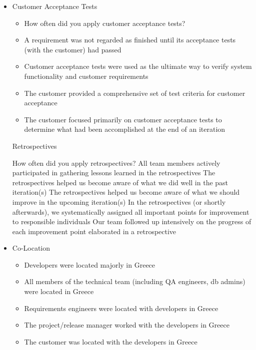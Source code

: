 \begin{appendices}
\begin{itemize}
\begin{itemize}
		\end{itemize}
	\item Customer Acceptance Tests
		\begin{itemize}
			\item How often did you apply customer acceptance tests?
			\item A requirement was not regarded as finished until its acceptance tests (with the customer) had passed
			\item Customer acceptance tests were used as the ultimate way to verify system functionality and customer requirements
			\item The customer provided a comprehensive set of test criteria for customer acceptance
			\item The customer focused primarily on customer acceptance tests to determine what had been accomplished at the end of an iteration
		\end{itemize}
	\removed Retrospectives
		\begin{itemize}
			\removed How often did you apply retrospectives?
			\removed All team members actively participated in gathering lessons learned in the retrospectives
			\removed The retrospectives helped us become aware of what we did well in the past iteration(s)
			\removed The retrospectives helped us become aware of what we should improve in the upcoming iteration(s)
			\removed In the retrospectives (or shortly afterwards), we systematically assigned all important points for improvement to responsible individuals
			\removed Our team followed up intensively on the progress of each improvement point elaborated in a retrospective
		\end{itemize}
	\item Co-Location
		\begin{itemize}
			\item Developers were located majorly in Greece
			\item All members of the technical team (including QA engineers, db admins) were located in Greece
			\item Requirements engineers were located with developers in Greece
			\item The project/release manager worked with the developers in Greece
			\item The customer was located with the developers in Greece
		\end{itemize}	
\end{itemize}





\end{appendices}
